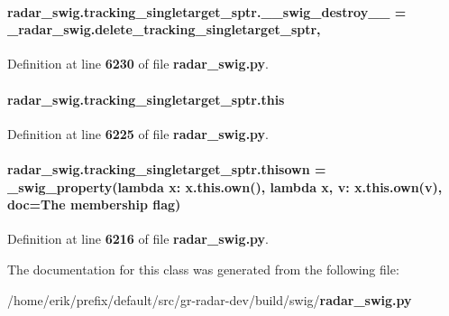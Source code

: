 \paragraph[{\+\_\+\+\_\+swig\+\_\+destroy\+\_\+\+\_\+}]{\setlength{\rightskip}{0pt plus 5cm}radar\+\_\+swig.\+tracking\+\_\+singletarget\+\_\+sptr.\+\_\+\+\_\+swig\+\_\+destroy\+\_\+\+\_\+ = \+\_\+radar\+\_\+swig.\+delete\+\_\+tracking\+\_\+singletarget\+\_\+sptr\hspace{0.3cm}{\ttfamily [static]}, {\ttfamily [private]}}\label{classradar__swig_1_1tracking__singletarget__sptr_a480b34c99bffc0e1f886f0c930640842}


Definition at line {\bf 6230} of file {\bf radar\+\_\+swig.\+py}.

\paragraph[{this}]{\setlength{\rightskip}{0pt plus 5cm}radar\+\_\+swig.\+tracking\+\_\+singletarget\+\_\+sptr.\+this}\label{classradar__swig_1_1tracking__singletarget__sptr_acd3f0b5a029e8b0cbf93179424840e07}


Definition at line {\bf 6225} of file {\bf radar\+\_\+swig.\+py}.

\paragraph[{thisown}]{\setlength{\rightskip}{0pt plus 5cm}radar\+\_\+swig.\+tracking\+\_\+singletarget\+\_\+sptr.\+thisown = {\bf \+\_\+swig\+\_\+property}(lambda x\+: x.\+this.\+own(), lambda {\bf x}, v\+: x.\+this.\+own(v), doc=\textquotesingle{}The membership flag\textquotesingle{})\hspace{0.3cm}{\ttfamily [static]}}\label{classradar__swig_1_1tracking__singletarget__sptr_a9a90bc8c7f30ab7d54f50dbd67aeb977}


Definition at line {\bf 6216} of file {\bf radar\+\_\+swig.\+py}.



The documentation for this class was generated from the following file\+:\begin{DoxyCompactItemize}
\item 
/home/erik/prefix/default/src/gr-\/radar-\/dev/build/swig/{\bf radar\+\_\+swig.\+py}\end{DoxyCompactItemize}

